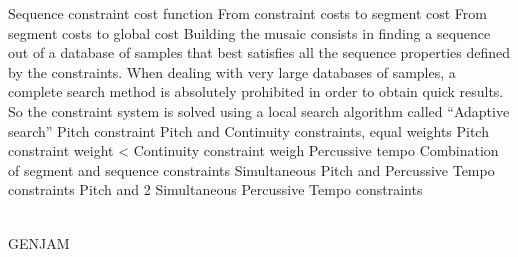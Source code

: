Sequence constraint cost function
From constraint costs to segment cost
From segment costs to global cost
Building the musaic consists in finding a sequence out of a database of samples that best satisfies all the sequence properties defined by the constraints. When dealing with very large databases of samples, a complete search method is absolutely prohibited in order to obtain quick results. So the constraint system is solved using a local search algorithm called “Adaptive search”
Pitch constraint
Pitch and Continuity constraints, equal weights
Pitch constraint weight < Continuity constraint weigh
Percussive tempo
Combination of segment and sequence constraints
Simultaneous Pitch and Percussive Tempo constraints Pitch and 2 Simultaneous Percussive Tempo constraints

\\ GENJAM

